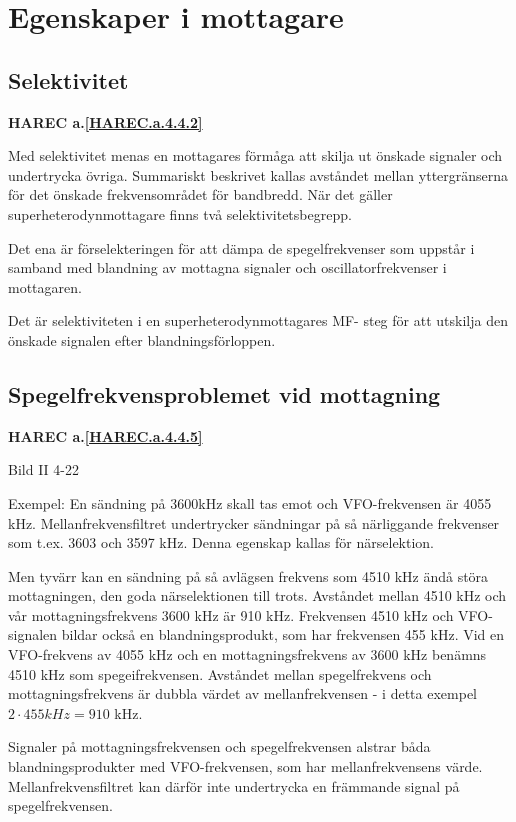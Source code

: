 \section{Egenskaper i mottagare}

\subsection{Selektivitet}
\textbf{HAREC a.\ref{HAREC.a.4.4.2}\label{myHAREC.a.4.4.2}}

Med selektivitet menas en mottagares förmåga att skilja ut önskade
signaler och undertrycka övriga. Summariskt beskrivet kallas avståndet
mellan yttergränserna för det önskade frekvensområdet för
bandbredd. När det gäller superheterodynmottagare finns två
selektivitetsbegrepp.

Det ena är förselekteringen för att dämpa de spegelfrekvenser som
uppstår i samband med blandning av mottagna signaler och
oscillatorfrekvenser i mottagaren.

Det är selektiviteten i en superheterodynmottagares MF- steg för att
utskilja den önskade signalen efter blandningsförloppen.

\subsection{Spegelfrekvensproblemet vid mottagning}
\textbf{HAREC a.\ref{HAREC.a.4.4.5}\label{myHAREC.a.4.4.5}}

Bild II 4-22

Exempel: En sändning på 3600kHz skall tas emot och VFO-frekvensen är
4055 kHz. Mellanfrekvensfiltret undertrycker sändningar på så
närliggande frekvenser som t.ex. 3603 och 3597 kHz. Denna egenskap
kallas för närselektion.

Men tyvärr kan en sändning på så avlägsen frekvens som 4510 kHz ändå
störa mottagningen, den goda närselektionen till trots. Avståndet
mellan 4510 kHz och vår mottagningsfrekvens 3600 kHz är 910 kHz.
Frekvensen 4510 kHz och VFO-signalen bildar också en
blandningsprodukt, som har frekvensen 455 kHz. Vid en VFO-frekvens av
4055 kHz och en mottagningsfrekvens av 3600 kHz benämns 4510 kHz som
spegeifrekvensen. Avståndet mellan spegelfrekvens och
mottagningsfrekvens är dubbla värdet av mellanfrekvensen - i detta
exempel \(2 \cdot 455kHz = 910\) kHz.

Signaler på mottagningsfrekvensen och spegelfrekvensen alstrar båda
blandningsprodukter med VFO-frekvensen, som har mellanfrekvensens
värde. Mellanfrekvensfiltret kan därför inte undertrycka en främmande
signal på spegelfrekvensen.

